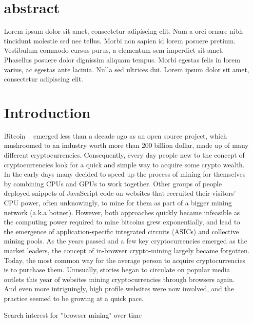 \section{abstract}
Lorem ipsum dolor sit amet, consectetur adipiscing elit. Nam a orci ornare nibh tincidunt molestie sed nec tellus. Morbi non sapien id lorem posuere pretium. Vestibulum commodo cursus purus, a elementum sem imperdiet sit amet. Phasellus posuere dolor dignissim aliquam tempus. Morbi egestas felis in lorem varius, ac egestas ante lacinia. Nulla sed ultrices dui. Lorem ipsum dolor sit amet, consectetur adipiscing elit. 

\section{Introduction}

Bitcoin ~\cite{nakamoto2008bitcoin} emerged less than a decade ago as an open source project, which mushroomed to an industry worth more than 200 billion dollar, made up of many different cryptocurrencies. Consequently, every day people new to the concept of cryptocurrencies look for a quick and simple way to acquire some crypto wealth. In the early days many decided to speed up the process of mining for themselves by combining CPUs and GPUs to work together. Other groups of people deployed snippets of JavaScript code on websites that recruited their visitors’ CPU power, often unknowingly, to mine for them as part of a bigger mining network (a.k.a botnet). However, both approaches quickly became infeasible as the computing power required to mine bitcoins grew exponentially, and lead to the emergence of application-specific integrated circuits (ASICs) and collective mining pools. As the years passed and a few key cryptocurrencies emerged as the market leaders, the concept of in-browser crypto-mining largely became forgotten. Today, the most common way for the average person to acquire cryptocurrencies is to purchase them. Unusually, stories began to circulate on popular media outlets this year of websites mining cryptocurrencies through browsers again. And even more intriguingly, high profile websites were now involved, and the practice seemed to be growing at a quick pace.


\begin{center}
	\caption{Search interest for "browser mining" over time}
\end{center}

